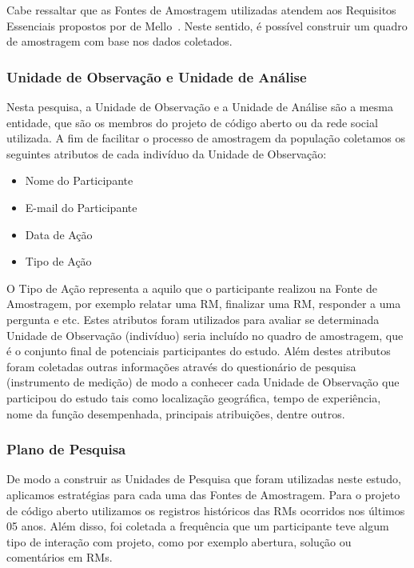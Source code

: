 Cabe ressaltar que as Fontes de Amostragem utilizadas atendem aos Requisitos
Essenciais propostos por de Mello~\cite{de2015investigating}. Neste sentido, é
possível construir um quadro de amostragem com base nos dados coletados.

\subsubsection{Unidade de Observação e Unidade de Análise}
\label{subsubsec:unidade_observacao}

Nesta pesquisa, a Unidade de Observação e a Unidade de Análise são a mesma
entidade, que são os membros do projeto de código aberto ou da rede social
utilizada. A fim de facilitar o processo de amostragem da população coletamos os
seguintes atributos de cada indivíduo da Unidade de Observação:

\begin{itemize}
	\item Nome do Participante
	\item E-mail do Participante
	\item Data de Ação
	\item Tipo de Ação
\end{itemize}

O Tipo de Ação representa a aquilo que o participante realizou na Fonte de
Amostragem, por exemplo relatar uma RM, finalizar uma RM, responder a uma
pergunta e etc. Estes atributos foram utilizados para avaliar se determinada
Unidade de Observação (indivíduo) seria incluído no quadro de amostragem, que é
o conjunto final de potenciais participantes do estudo. Além destes atributos
foram coletadas outras informações através do questionário de pesquisa
(instrumento de medição) de modo a conhecer cada Unidade de Observação que
participou do estudo tais como localização geográfica, tempo de experiência,
nome da função desempenhada, principais atribuições, dentre outros.

\subsubsection{Plano de Pesquisa}
\label{subsubsec:pesquisa_profissionais_plano_pesquisa}

De modo a construir as Unidades de Pesquisa que foram utilizadas neste estudo,
aplicamos estratégias para cada uma das Fontes de Amostragem. Para o projeto de
código aberto utilizamos os registros históricos das RMs ocorridos nos últimos
05 anos. Além disso, foi coletada a frequência que um participante teve algum
tipo de interação com projeto, como por exemplo abertura, solução ou comentários
em RMs.

